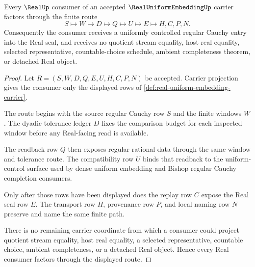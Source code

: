 \begin{theorem}
\label{thm:real-uniform-embedding-seal-handoff}
Every $\RealUp$ consumer of an accepted $\RealUniformEmbeddingUp$ carrier factors through the finite route
$$
S \longmapsto W \longmapsto D \longmapsto Q \longmapsto U \longmapsto E \longmapsto H,C,P,N .
$$
Consequently the consumer receives a uniformly controlled regular Cauchy entry into the Real seal, and receives no quotient stream equality, host real equality, selected representative, countable-choice schedule, ambient completeness theorem, or detached Real object.
\end{theorem}
\begin{proof}
Let $R=(S,W,D,Q,E,U,H,C,P,N)$ be accepted. Carrier projection gives the consumer only the displayed rows of \autoref{def:real-uniform-embedding-carrier}.

The route begins with the source regular Cauchy row $S$ and the finite windows $W$. The dyadic tolerance ledger $D$ fixes the comparison budget for each inspected window before any Real-facing read is available.

The readback row $Q$ then exposes regular rational data through the same window and tolerance route. The compatibility row $U$ binds that readback to the uniform-control surface used by dense uniform embedding and Bishop regular Cauchy completion consumers.

Only after those rows have been displayed does the replay row $C$ expose the Real seal row $E$. The transport row $H$, provenance row $P$, and local naming row $N$ preserve and name the same finite path.

There is no remaining carrier coordinate from which a consumer could project quotient stream equality, host real equality, a selected representative, countable choice, ambient completeness, or a detached Real object. Hence every Real consumer factors through the displayed route.
\end{proof}

